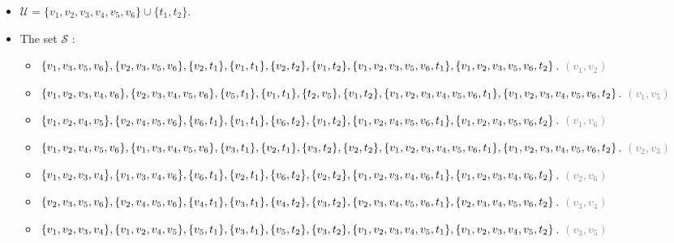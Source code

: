 \begin{itemize}
    \item $\mathcal{U} = \{v_1, v_2, v_3, v_4, v_5, v_6\} \cup \{t_1, t_2\}.$
    \item The set $\mathcal{S}$ :
    \begin{itemize}
        \item $\{v_1, v_3, v_5, v_6\}, \{v_2, v_3, v_5, v_6\},
        \{v_2, t_1\}, \{v_1, t_1\}, \{v_2, t_2\}, \{v_1, t_2\}, \\
        \{v_1, v_2, v_3, v_5, v_6, t_1\},  \{v_1, v_2, v_3, v_5, v_6, t_2\}$. \textcolor{gray}{$(v_1, v_2)$}

        \item $\{v_1, v_2, v_3, v_4, v_6\}, \{v_2, v_3, v_4, v_5, v_6\},
        \{v_5, t_1\}, \{v_1, t_1\}, \{t_2, v_5\}, \{v_1, t_2\}, \\
        \{v_1, v_2, v_3, v_4, v_5, v_6, t_1\}, \{v_1, v_2, v_3, v_4, v_5, v_6, t_2\}$.  \textcolor{gray}{$(v_1, v_5)$}

        \item $\{v_1, v_2, v_4, v_5\}, \{v_2, v_4, v_5, v_6\},
        \{v_6, t_1\}, \{v_1, t_1\}, \{v_6, t_2\}, \{v_1, t_2\}, \\
        \{v_1, v_2, v_4, v_5, v_6, t_1\}, \{v_1, v_2, v_4, v_5, v_6, t_2\}$.   \textcolor{gray}{$(v_1, v_6)$}

        \item $\{v_1, v_2, v_4, v_5, v_6\}, \{v_1, v_3, v_4, v_5, v_6\},
        \{v_3, t_1\}, \{v_2, t_1\}, \{v_3, t_2\}, \{v_2, t_2\}, \\
        \{v_1, v_2, v_3, v_4, v_5, v_6, t_1\}, \{v_1,v_2,v_3,v_4,v_5,v_6,t_2\}$. \textcolor{gray}{$(v_2, v_3)$}

        \item $\{v_1, v_2, v_3, v_4\}, \{v_1, v_3, v_4, v_6\},
        \{v_6, t_1\}, \{v_2, t_1\}, \{v_6, t_2\}, \{v_2, t_2\}, \\
        \{v_1, v_2, v_3, v_4, v_6, t_1\}, \{v_1, v_2, v_3, v_4, v_6, t_2\}$.   \textcolor{gray}{$(v_2, v_6)$}

        \item $\{v_2, v_3, v_5, v_6\}, \{v_2, v_4, v_5, v_6\},
        \{v_4, t_1\}, \{v_3, t_1\}, \{v_4, t_2\}, \{v_3, t_2\}, \\
        \{v_2, v_3, v_4, v_5, v_6, t_1\}, \{v_2, v_3, v_4, v_5, v_6, t_2\}$.   \textcolor{gray}{$(v_3, v_4)$}

        \item $\{v_1, v_2, v_3, v_4\}, \{v_1, v_2, v_4, v_5\},
        \{v_5, t_1\}, \{v_3, t_1\}, \{v_5, t_2\}, \{v_3, t_2\}, \\
        \{v_1, v_2, v_3, v_4, v_5, t_1\}, \{v_1, v_2, v_3, v_4, v_5, t_2\}$.  \textcolor{gray}{$(v_3, v_5)$}


\end{itemize}
\end{itemize}
